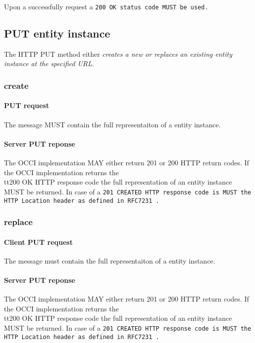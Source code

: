 \documentclass[10pt,a4paper]{article}
\begin{document}
Upon a successfully request a \tt{200 OK} status code MUST be used.

\subsection{PUT entity instance}
The HTTP PUT method either \em{creates} a new or \em{replaces} an existing entity instance at the specified URL.

\subsubsection{create}

\paragraph{PUT request}
The message MUST contain the full representaiton of a entity instance.

\paragraph{Server PUT reponse}
The OCCI implementation MAY either return 201 or 200 HTTP return codes. If the OCCI implementation
returns the \\tt{200 OK} HTTP response code the full representation of an entity instance MUST be returned. 
In case of a \tt{201 CREATED} HTTP response code is MUST the HTTP Location header as defined in RFC7231 \cite{rfc7231}.

\subsubsection{replace}

\paragraph{Client PUT request}
The message must contain the full representaiton of a entity instance.

\paragraph{Server PUT reponse}
The OCCI implementation MAY either return 201 or 200 HTTP return codes. If the OCCI implementation
returns the \\tt{200 OK} HTTP response code the full representation of an entity instance MUST be returned. 
In case of a \tt{201 CREATED} HTTP response code is MUST the HTTP Location header as defined in RFC7231 \cite{rfc7231}.
\end{document}
